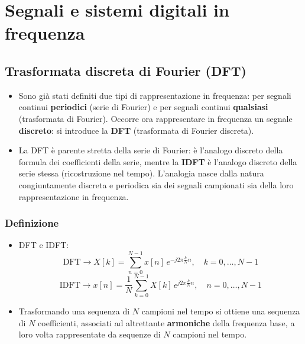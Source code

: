 \documentclass[12pt, a4paper]{article}
\begin{document}
\section{Segnali e sistemi digitali in frequenza}

\subsection{Trasformata discreta di Fourier (DFT)}
\begin{itemize}
    \item Sono già stati definiti due tipi di rappresentazione in frequenza: per segnali continui \textbf{periodici} (serie di Fourier) e per segnali continui \textbf{qualsiasi} (trasformata di Fourier). Occorre ora rappresentare in frequenza un segnale \textbf{discreto}: si introduce la \textbf{DFT} (trasformata di Fourier discreta).
    \item La DFT è parente stretta della serie di Fourier: è l'analogo discreto della formula dei coefficienti della serie, mentre la \textbf{IDFT} è l'analogo discreto della serie stessa (ricostruzione nel tempo). L'analogia nasce dalla natura congiuntamente discreta e periodica sia dei segnali campionati sia della loro rappresentazione in frequenza.
\end{itemize}

\subsubsection{Definizione}
\begin{itemize}
    \item DFT e IDFT:
    $$\text{DFT}\to X[k] = \sum_{n=0}^{N-1} x[n]\,e^{-j2\pi\frac{k}{N}n}, \quad k=0,\dots,N-1$$
    $$\text{IDFT}\to x[n] = \frac1N\sum_{k=0}^{N-1} X[k]\,e^{j2\pi\frac{k}{N}n}, \quad n=0,\dots,N-1$$
    \item Trasformando una sequenza di $N$ campioni nel tempo si ottiene una sequenza di $N$ coefficienti, associati ad altrettante \textbf{armoniche} della frequenza base, a loro volta rappresentate da sequenze di $N$ campioni nel tempo.
\end{itemize}
\end{document}
